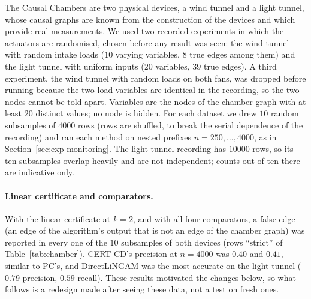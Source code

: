 The Causal Chambers \citep{gamella2025chamber} are two physical devices, a wind
tunnel and a light tunnel, whose causal graphs are known from the construction of
the devices and which provide real measurements. We used two recorded
experiments in which the actuators are randomised, chosen before any result was
seen: the wind tunnel with random intake loads ($10$ varying variables, $8$ true
edges among them) and the light tunnel with uniform inputs ($20$ variables, $39$
true edges). A third experiment, the wind tunnel with random
loads on both fans, was dropped before running because the two load variables
are identical in the recording, so the two nodes cannot be told apart. Variables
are the nodes of the chamber graph with at least $20$ distinct values; no node is
hidden. For each dataset we drew $10$ random subsamples of $4000$ rows (rows are
shuffled, to break the serial dependence of the recording) and ran each method
on nested prefixes $n=250,\dots,4000$, as in Section~\ref{sec:exp-monitoring}. The
light tunnel recording has $10000$ rows, so its ten subsamples overlap heavily and
are not independent; counts out of ten there are indicative only.

\paragraph{Linear certificate and comparators.} With the linear
certificate at $k=2$, and with all four comparators, a false edge (an edge of
the algorithm's output that is not an edge of the chamber graph) was reported in
every one of the $10$ subsamples of both devices (rows ``strict'' of
Table~\ref{tab:chamber}). CERT-CD's precision at $n=4000$ was $0.40$ and
$0.41$, similar to PC's, and DirectLiNGAM was the most accurate on the light
tunnel ($0.79$ precision, $0.59$ recall). These results motivated the changes below, so what follows is a
redesign made after seeing these data, not a test on fresh ones.

